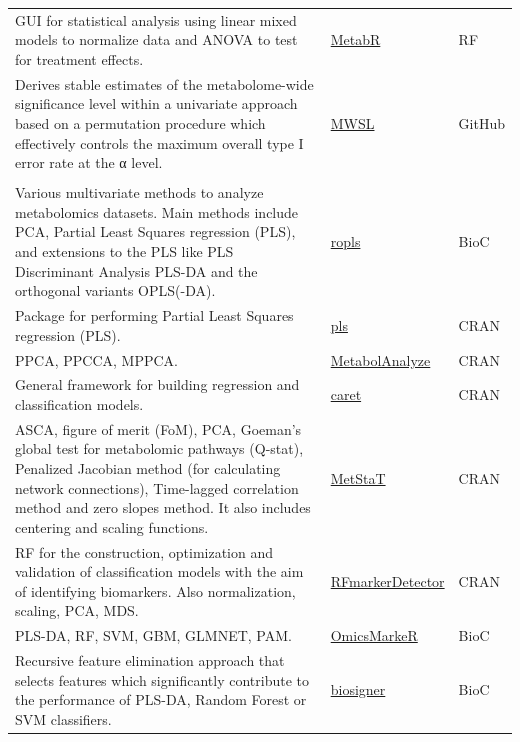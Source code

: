 \documentclass[]{article}
\begin{document}
\begin{longtable}[t]{>{\raggedright\arraybackslash}p{30em}>{\raggedright\arraybackslash}p{10em}>{\raggedright\arraybackslash}p{3em}}
\rowcolor{gray!6}  GUI for statistical analysis using linear mixed models to normalize data and ANOVA to test for treatment effects. & \href{http://metabr.r-forge.r-project.org/}{MetabR} & RF\\
Derives stable estimates of the metabolome-wide significance level within a univariate approach based on a permutation procedure which effectively controls the maximum overall type I error rate at the α level. & \href{https://github.com/AlinaPeluso/MWSL}{MWSL} & GitHub\\
\rowcolor{gray!6}  \addlinespace[0.3em]
\multicolumn{3}{l}{\textbf{Multivariate modeling and feature selection}}\\
Various multivariate methods to analyze metabolomics datasets. Main methods include PCA, Partial Least Squares regression (PLS), and extensions to the PLS like PLS Discriminant Analysis PLS-DA and the orthogonal variants OPLS(-DA). & \href{http://bioconductor.org/packages/release/bioc/html/ropls.html}{ropls} & BioC\\
Package for performing Partial Least Squares regression (PLS). & \href{https://cran.r-project.org/package=pls}{pls} & CRAN\\
\rowcolor{gray!6}  PPCA, PPCCA, MPPCA. & \href{https://cran.r-project.org/package=MetabolAnalyze}{MetabolAnalyze} & CRAN\\
General framework for building regression and classification models. & \href{https://cran.r-project.org/package=caret}{caret} & CRAN\\
\rowcolor{gray!6}  ASCA, figure of merit (FoM), PCA, Goeman’s global test for metabolomic pathways (Q-stat), Penalized Jacobian method (for calculating network connections), Time-lagged correlation method and zero slopes method. It also includes centering and scaling functions. & \href{https://cran.r-project.org/package=MetStaT}{MetStaT} & CRAN\\
RF for the construction, optimization and validation of classification models with the aim of identifying biomarkers. Also normalization, scaling, PCA, MDS. & \href{https://cran.r-project.org/package=RFmarkerDetector}{RFmarkerDetector} & CRAN\\
\rowcolor{gray!6}  PLS-DA, RF, SVM, GBM, GLMNET, PAM. & \href{http://bioconductor.org/packages/release/bioc/html/OmicsMarkeR.html}{OmicsMarkeR} & BioC\\
Recursive feature elimination approach that selects features which significantly contribute to the performance of PLS-DA, Random Forest or SVM classifiers. & \href{http://bioconductor.org/packages/release/bioc/html/biosigner.html}{biosigner} & BioC\\

\end{longtable}
\end{document}
